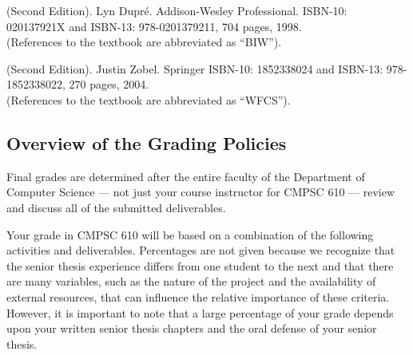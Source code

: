\documentclass[11pt]{article}
\begin{document}
 (Second
Edition). Lyn Dupr\'e.  Addison-Wesley Professional.  ISBN-10: 020137921X and
ISBN-13: 978-0201379211, 704 pages, 1998.\\ (References to the textbook are
abbreviated as ``BIW'').

\vspace*{.1in}

 (Second Edition).  Justin Zobel.
Springer ISBN-10: 1852338024 and ISBN-13: 978-1852338022, 270 pages, 2004. \\
(References to the textbook are abbreviated as ``WFCS'').

\subsection*{Overview of the Grading Policies}

Final grades are determined after the entire faculty of the Department of
Computer Science --- not just your course instructor for CMPSC 610 --- review
and discuss all of the submitted deliverables.

Your grade in CMPSC 610 will be based on a combination of the following
activities and deliverables. Percentages are not given because we recognize
that the senior thesis experience differs from one student to the next and that
there are many variables, such as the nature of the project and the
availability of external resources, that can influence the relative importance
of these criteria. However, it is important to note that a large percentage of
your grade depends upon your written senior thesis chapters and the oral
defense of your senior thesis.
\end{document}
